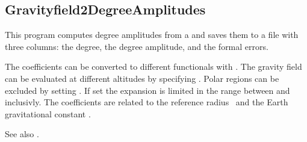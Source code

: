 \subsection{Gravityfield2DegreeAmplitudes}\label{Gravityfield2DegreeAmplitudes}
This program computes degree amplitudes from a 
and saves them to a  file with three columns: the degree, the degree amplitude, and the formal errors.

The coefficients can be converted to different functionals with .
The gravity field can be evaluated at different altitudes by specifying .
Polar regions can be excluded by setting .
If set the expansion is limited in the range between 
and  inclusivly.
The coefficients are related to the reference radius~
and the Earth gravitational constant .

See also .


